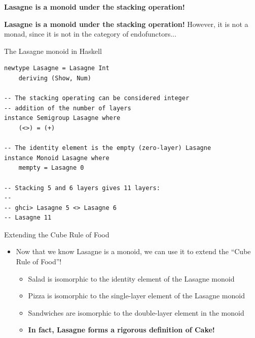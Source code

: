 \documentclass{beamer}
\begin{document}
\begin{frame}
    \begin{center}
        \Huge\textbf{Lasagne is a monoid under the stacking operation!}
    \end{center}
\end{frame}

\begin{frame}
    \begin{center}
        \Huge\textbf{Lasagne is a monoid under the stacking operation!}
        \vskip 2cm
        \small{However, it is not a monad, since it is not in the category of endofunctors...}
    \end{center}
\end{frame}

\begin{frame}[fragile]{The Lasagne monoid in Haskell}
    \begin{verbatim}
newtype Lasagne = Lasagne Int
    deriving (Show, Num)

-- The stacking operating can be considered integer 
-- addition of the number of layers
instance Semigroup Lasagne where
    (<>) = (+)

-- The identity element is the empty (zero-layer) Lasagne
instance Monoid Lasagne where
    mempty = Lasagne 0

-- Stacking 5 and 6 layers gives 11 layers:
--
-- ghci> Lasagne 5 <> Lasagne 6
-- Lasagne 11
    \end{verbatim}
\end{frame}


\begin{frame}{Extending the Cube Rule of Food}
    \begin{itemize}
        \item<1-> Now that we know Lasagne is a monoid, we can use it to extend the ``Cube Rule of Food''!
        \begin{itemize}
            \item Salad is isomorphic to the identity element of the Lasagne monoid
            \item Pizza is isomorphic to the single-layer element of the Lasagne monoid
            \item Sandwiches are isomorphic to the double-layer element in the monoid
            \vskip 0.5cm
            \item<2-> \textbf{In fact, Lasagne forms a rigorous definition of Cake!}
        \end{itemize}
    \end{itemize}
\end{frame}
\end{document}
